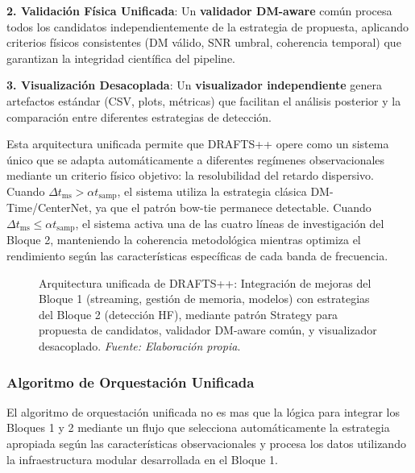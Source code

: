 \textbf{2. Validación Física Unificada}: Un \textbf{validador DM-aware} común procesa todos los candidatos independientemente de la estrategia de propuesta, aplicando criterios físicos consistentes (DM válido, SNR umbral, coherencia temporal) que garantizan la integridad científica del pipeline.

\textbf{3. Visualización Desacoplada}: Un \textbf{visualizador independiente} genera artefactos estándar (CSV, plots, métricas) que facilitan el análisis posterior y la comparación entre diferentes estrategias de detección.

Esta arquitectura unificada permite que DRAFTS++ opere como un sistema único que se adapta automáticamente a diferentes regímenes observacionales mediante un criterio físico objetivo: la resolubilidad del retardo dispersivo. Cuando $\Delta t_{\mathrm{ms}} > \alpha t_{\mathrm{samp}}$, el sistema utiliza la estrategia clásica DM-Time/CenterNet, ya que el patrón bow-tie permanece detectable. Cuando $\Delta t_{\mathrm{ms}} \leq \alpha t_{\mathrm{samp}}$, el sistema activa una de las cuatro líneas de investigación del Bloque 2, manteniendo la coherencia metodológica mientras optimiza el rendimiento según las características específicas de cada banda de frecuencia.

\begin{figure}[H] 
\centering 
\caption{Arquitectura unificada de DRAFTS++: Integración de mejoras del Bloque 1 (streaming, gestión de memoria, modelos) con estrategias del Bloque 2 (detección HF), mediante patrón Strategy para propuesta de candidatos, validador DM-aware común, y visualizador desacoplado. \textit{Fuente: Elaboración propia}.}
\label{fig:arquitectura-unificada} 
\end{figure}

\subsubsection{Algoritmo de Orquestación Unificada}

El algoritmo de orquestación unificada no es mas que la lógica para integrar los Bloques 1 y 2 mediante un flujo que selecciona automáticamente la estrategia apropiada según las características observacionales y procesa los datos utilizando la infraestructura modular desarrollada en el Bloque 1.

